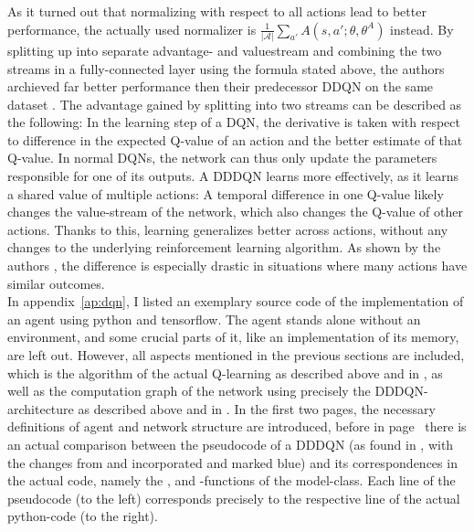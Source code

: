 As it turned out that normalizing with respect to all actions lead to better performance, the actually used normalizer is $\frac{1}{|\mathcal{A}|} \sum_{a'} A(s, a'; \theta, \theta^A)$ instead. By splitting up into separate advantage- and valuestream and combining the two streams in a fully-connected layer using the formula stated above, the authors archieved far better performance then their predecessor DDQN on the same dataset \cite{wang_dueling_2015}. The advantage gained by splitting into two streams can be described as the following: In the learning step of a DQN, the derivative is taken with respect to difference in the expected Q-value of an action and the better estimate of that Q-value. In normal DQNs, the network can thus only update the parameters responsible for one of its outputs. A DDDQN learns more effectively, as it learns a shared value of multiple actions: A temporal difference in one Q-value likely changes the value-stream of the network, which also changes the Q-value of other actions. Thanks to this, learning generalizes better across actions, without any changes to the underlying reinforcement learning algorithm. As shown by the authors \cite{wang_dueling_2015}, the difference is especially drastic in situations where many actions have similar outcomes.\\


In appendix~\ref{ap:dqn}, I listed an exemplary source code of the implementation of an agent using python and tensorflow. The agent stands alone without an environment, and some crucial parts of it, like an implementation of its memory, are left out. However, all aspects mentioned in the previous sections are included, which is the algorithm of the actual Q-learning as described above and in \cite{van_hasselt_deep_2015}, as well as the computation graph of the network using precisely the DDDQN-architecture as described above and in \cite{wang_dueling_2015}. In the first two pages, the necessary definitions of agent and network structure are introduced, before in page~\pageref{ap:dqn_comparison} there is an actual comparison between the pseudocode of a DDDQN (as found in \cite{mnih_human-level_2015}, with the changes from \cite{van_hasselt_deep_2015} and \cite{lillicrap_continuous_2015} incorporated and marked blue) and its correspondences in the actual code, namely the ,  and -functions of the model-class. Each line of the pseudocode (to the left) corresponds precisely to the respective line of the actual python-code (to the right).


